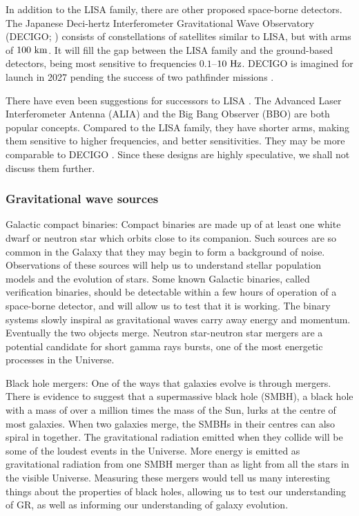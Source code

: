In addition to the LISA family, there are other proposed space-borne detectors. The Japanese Deci-hertz Interferometer Gravitational Wave Observatory (DECIGO; \citealt{Kawamura2006,Kawamura2011}) consists of constellations of satellites similar to LISA, but with arms of $100~\mathrm{km}$. It will fill the gap between the LISA family and the ground-based detectors, being most sensitive to frequencies $0.1$--$10~\mathrm{Hz}$. DECIGO is imagined for launch in 2027 pending the success of two pathfinder missions \citep{Ando2010}.

There have even been suggestions for successors to LISA \citep{Crowder2005}. The Advanced Laser Interferometer Antenna (ALIA) and the Big Bang Observer (BBO) are both popular concepts. Compared to the LISA family, they have shorter arms, making them sensitive to higher frequencies, and better sensitivities. They may be more comparable to DECIGO \citet{Yagi2011a}. Since these designs are highly speculative, we shall not discuss them further.

\subsubsection{Gravitational wave sources}\label{sec:GW-sources}



Galactic compact binaries: Compact binaries are made up of at least one white dwarf or neutron star which orbits close to its companion. Such sources are so common in the Galaxy that they may begin to form a background of noise. Observations of these sources will help us to understand stellar population models and the evolution of stars. Some known Galactic binaries, called verification binaries, should be detectable within a few hours of operation of a space-borne detector, and will allow us to test that it is working. The binary systems slowly inspiral as gravitational waves carry away energy and momentum. Eventually the two objects merge. Neutron star-neutron star mergers are a potential candidate for short gamma rays bursts, one of the most energetic processes in the Universe.

Black hole mergers: One of the ways that galaxies evolve is through mergers. There is evidence to suggest that a supermassive black hole (SMBH), a black hole with a mass of over a million times the mass of the Sun, lurks at the centre of most galaxies. When two galaxies merge, the SMBHs in their centres can also spiral in together. The gravitational radiation emitted when they collide will be some of the loudest events in the Universe. More energy is emitted as gravitational radiation from one SMBH merger than as light from all the stars in the visible Universe. Measuring these mergers would tell us many interesting things about the properties of black holes, allowing us to test our understanding of GR, as well as informing our understanding of galaxy evolution.

